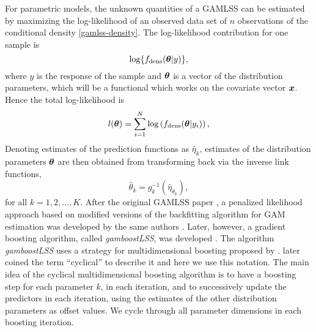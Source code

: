 For parametric models, the unknown quantities of a GAMLSS can be estimated by maximizing the log-likelihood of an observed
data set of $n$ observations of the conditional density \eqref{gamlss-density}.
The log-likelihood contribution for one sample is
\begin{equation}
    \log\{f_{\text{dens}}(\boldsymbol{\theta}|y)\},
\end{equation}
where $y$ is the response of the sample and $\boldsymbol{\theta}$ is a vector of the distribution parameters, which will be a functional which works on the covariate vector $\bm{x}$.
Hence the total log-likelihood is
\begin{equation}
    l(\boldsymbol{\theta})=\sum_{i=1}^N\log\left(f_{\text{dens}}(\boldsymbol{\theta}|y_i)\right),
\end{equation}
Denoting estimates of the prediction functions as $\hat{\eta}_k$, estimates of the distribution parameters $\boldsymbol{\theta}$ are then obtained from transforming back via the inverse link functions,
\begin{equation}
    \hat{\theta}_k=g_k^{-1}(\hat{\eta}_{\theta_k}),
\end{equation}
for all $k=1,2,\ldots,K$.
After the original GAMLSS paper \citep{gamlss}, a penalized likelihood approach based on modified versions of the backfitting algorithm for GAM estimation was developed by the same authors \citep{gamlssR}.
Later, however, a gradient boosting algorithm, called \textit{gamboostLSS}, was developed \citep{gamboostlss-paper}.
The algorithm \textit{gamboostLSS} uses a strategy for multidimensional boosting proposed by \citet{schmid}.
\citet{thomas2018} later coined the term ``cyclical'' to describe it and here we use this notation.
The main idea of the cyclical multidimensional boosting algorithm is to have a boosting step for each parameter $k$, in each iteration, and to successively update the predictors in each iteration, using the estimates of the other distribution parameters as offset values.
We cycle through all parameter dimensions in each boosting iteration.

